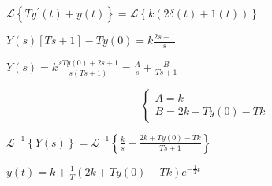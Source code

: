 \documentclass{article}
\begin{document}
\begin{enumerate}[label=\alph*)]
\begin{flushleft}
        $ \mathcal{L}\left\{T y^{\prime}\left(t\right) + y\left(t\right) \right\}= \mathcal{L}\left\{k\left(2\delta\left(t\right)+1\left(t\right)\right)\right\} $

        $ Y\left(s\right)\left[Ts+1\right]-Ty\left(0\right) = k\frac{2s+1}{s} $

        $ Y\left(s\right) = k\frac{sTy\left(0\right)+2s+1}{s\left(Ts+1\right)} = \frac{A}{s} + \frac{B}{Ts+1}$

        \[\begin{cases}
            A=k
            \\
            B=2k+Ty\left(0\right)-Tk
        \end{cases}\]

        $ \mathcal{L}^{-1}\left\{Y\left(s\right)\right\} = \mathcal{L}^{-1}\left\{\frac{k}{s}+\frac{2k+Ty\left(0\right)-Tk}{Ts+1}\right\} $

        $ y\left(t\right) = k+\frac{1}{T}\left(2k+Ty\left(0\right)-Tk\right)e^{-\frac{1}{T}t} $

    \end{flushleft}














\end{enumerate}
\end{document}
